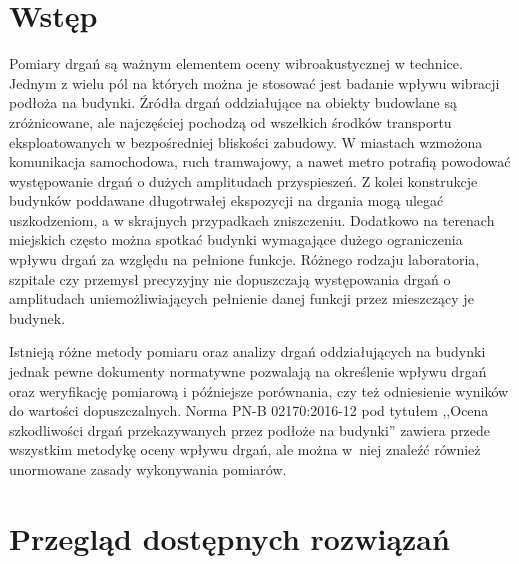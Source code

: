 \documentclass[a4paper,12pt]{mwart}
\let\Oldsection\section
\renewcommand{\section}{\FloatBarrier\Oldsection}
\begin{document}
\section{Wstęp}

Pomiary drgań są ważnym elementem oceny wibroakustycznej w technice. Jednym
z wielu pól na których można je stosować jest badanie wpływu wibracji
podłoża na budynki. Źródła drgań oddziałujące na obiekty budowlane są
zróżnicowane, ale najczęściej pochodzą od wszelkich środków transportu
eksploatowanych w bezpośredniej bliskości zabudowy. W miastach wzmożona
komunikacja samochodowa, ruch tramwajowy, a nawet metro potrafią powodować
występowanie drgań o dużych amplitudach przyspieszeń. Z kolei konstrukcje
budynków poddawane długotrwałej ekspozycji na drgania mogą ulegać
uszkodzeniom, a w skrajnych przypadkach zniszczeniu. Dodatkowo na terenach
miejskich często można spotkać budynki wymagające dużego ograniczenia wpływu
drgań za względu na pełnione funkcje. Różnego rodzaju laboratoria, szpitale
czy przemysł precyzyjny nie dopuszczają występowania drgań o amplitudach
uniemożliwiających pełnienie danej funkcji przez mieszczący je budynek.

Istnieją różne metody pomiaru oraz analizy drgań oddziałujących na budynki
jednak pewne dokumenty normatywne pozwalają na określenie wpływu drgań oraz
weryfikację pomiarową i późniejsze porównania, czy też odniesienie wyników
do wartości dopuszczalnych. Norma PN-B 02170:2016-12 pod tytułem ,,Ocena
szkodliwości drgań przekazywanych przez podłoże na budynki'' \cite{norma}
zawiera przede wszystkim metodykę oceny wpływu drgań, ale można w~niej
znaleźć również unormowane zasady wykonywania pomiarów.

\section{Przegląd dostępnych rozwiązań}
\end{document}

